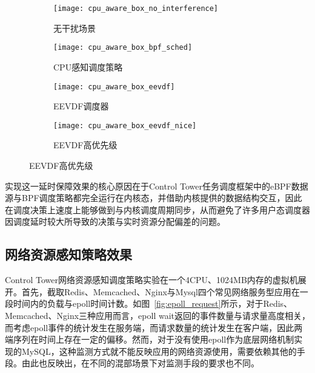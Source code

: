 \begin{figure}[H]
    \centering
    \begin{subfigure}[b]{0.35\textwidth}
        \texttt{[image: cpu\_aware\_box\_no\_interference]}
        \caption{无干扰场景}
        \label{fig:cpu_aware_box_no_interference}
    \end{subfigure}
    \begin{subfigure}[b]{0.35\textwidth}
        \texttt{[image: cpu\_aware\_box\_bpf\_sched]}
        \caption{CPU感知调度策略}
        \label{fig:cpu_aware_box_bpf_sched}
    \end{subfigure}
    \begin{subfigure}[b]{0.35\textwidth}
        \texttt{[image: cpu\_aware\_box\_eevdf]}
        \caption{EEVDF调度器}
        \label{fig:cpu_aware_box_eevdf}
    \end{subfigure}
    \begin{subfigure}[b]{0.35\textwidth}
        \texttt{[image: cpu\_aware\_box\_eevdf\_nice]}
        \caption{EEVDF高优先级}
        \label{fig:cpu_aware_box_eevdf_nice}
    \end{subfigure}
\label{fig:latency_box}
\end{figure}

实现这一延时保障效果的核心原因在于Control Tower任务调度框架中的eBPF数据源与BPF调度策略都完全运行在内核态，并借助内核提供的数据结构交互，因此在调度决策上速度上能够做到与内核调度周期同步，从而避免了许多用户态调度器因调度延时较大所导致的决策与实时资源分配偏差的问题。

\subsection{网络资源感知策略效果}

Control Tower网络资源感知调度策略实验在一个4CPU、1024MB内存的虚拟机展开。首先，截取Redis、Memcached、Nginx与Mysql四个常见网络服务型应用在一段时间内的负载与epoll时间计数。如图~\ref{fig:epoll_request}所示，对于Redis、Memcached、Nginx三种应用而言，epoll wait返回的事件数量与请求量高度相关，而考虑epoll事件的统计发生在服务端，而请求数量的统计发生在客户端，因此两端序列在时间上存在一定的偏移。然而，对于没有使用epoll作为底层网络机制实现的MySQL，这种监测方式就不能反映应用的网络资源使用，需要依赖其他的手段。由此也反映出，在不同的混部场景下对监测手段的要求也不同。

